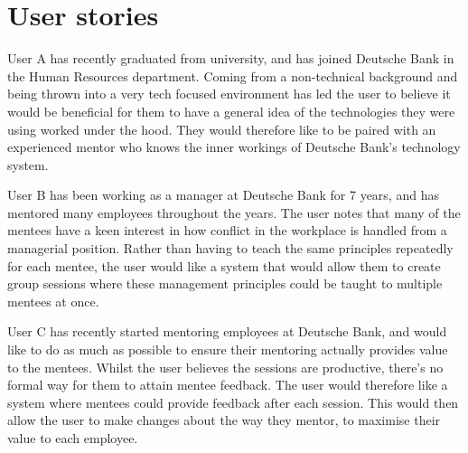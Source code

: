\documentclass[10pt]{article}
\begin{document}
\vspace{-8mm}\section{User stories}\vspace{-2mm}
User A has recently graduated from university, and has joined Deutsche Bank in
the Human Resources department. Coming from a non-technical background and being
thrown into a very tech focused environment has led the user to believe it would
be beneficial for them to have a general idea of the technologies they were
using worked under the hood. They would therefore like to be paired with an
experienced mentor who knows the inner workings of Deutsche Bank's technology
system.

User B has been working as a manager at Deutsche Bank for 7 years, and has
mentored many employees throughout the years. The user notes that many of the
mentees have a keen interest in how conflict in the workplace is handled from a
managerial position. Rather than having to teach the same principles repeatedly
for each mentee, the user would like a system that would allow them to create
group sessions where these management principles could be taught to multiple
mentees at once.

User C has recently started mentoring employees at Deutsche Bank, and would like
to do as much as possible to ensure their mentoring actually provides value to
the mentees. Whilst the user believes the sessions are productive, there's no
formal way for them to attain mentee feedback. The user would therefore like a
system where mentees could provide feedback after each session. This would then
allow the user to make changes about the way they mentor, to maximise their
value to each employee.
\end{document}
